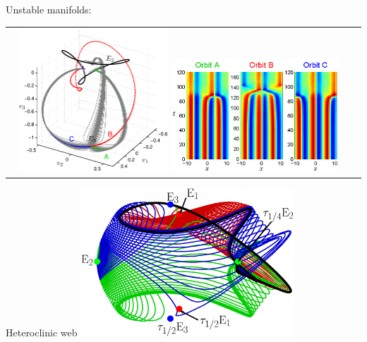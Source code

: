 \documentclass{beamer}
\begin{document}
\begin{frame}{Unstable manifolds: }
 \begin{tabular}{cc}
 \includegraphics[width=0.45\textwidth]{../../figs/ks22_E3_manifold}
 \includegraphics[width=0.5\textwidth]{../../figs/ks22_E3_orbits_c}	
 \end{tabular}
\end{frame}

\begin{frame}{Heteroclinic web}
         \includegraphics[width=0.6\textwidth]{../../figs/KS22hetero} 
\end{frame}
\end{document}
